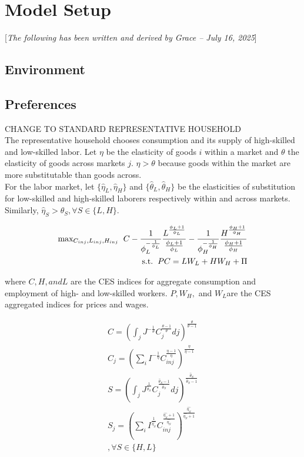


\section{Model Setup}
[\textit{The following has been written and derived by Grace -- July 16, 2025}]
\subsection{Environment}

\subsection{Preferences}

CHANGE TO STANDARD REPRESENTATIVE HOUSEHOLD\\

The representative household chooses consumption and its supply of high-skilled and low-skilled labor. Let $\eta$ be the elasticity of goods $i$ within a market and $\theta$ the elasticity of goods across markets $j$. $\eta > \theta$ because goods within the market are more substitutable than goods across. \\

For the labor market, let $\{\hat{\eta}_L, \hat{\eta}_H\}$ and $\{\hat{\theta}_L,\hat{\theta}_H\} $ be the elasticities of substitution for low-skilled and high-skilled laborers respectively within and across markets. Similarly, $\hat{\eta}_S > \hat{\theta}_S, \forall S \in \{L,H\}$.

\begin{align}
    \text{max}_{C_{inj}, L_{inj}, H_{inj}} \hspace{0.2 cm} C - \frac{1}{\phi_L^{-\frac{1}{\phi_L}}}\frac{L^{\frac{\phi_L +1}{\phi_L}}}{\frac{\phi_L +1}{\phi_L}} - \frac{1}{\phi_H^{-\frac{1}{\phi_H}}}\frac{H^{\frac{\phi_H +1}{\phi_H}}}{\frac{\phi_H +1}{\phi_H}} \\
    \text{s.t.} \hspace{0.2 cm} PC =LW_L+HW_H+\Pi
\end{align}

where $C, H, and L$ are the CES indices for aggregate consumption and employment of
high- and low-skilled workers. $P, W_H,$ and $ W_L $are the CES aggregated indices for prices and wages. 

\begin{align}
    C = (\int_j J^{-\frac{1}{\theta}} C_j^{\frac{\theta-1}{\theta}}dj)^{\frac{\theta}{\theta-1}} \\
    C_j = (\sum_i I^{-\frac{1}{\eta}} C_{inj}^{\frac{\eta-1}{\eta}})^{\frac{\eta}{\eta-1}} \\
    S = (\int_j J^{\frac{1}{\hat{\theta}_S}} C_j^{\frac{\hat{\theta}_S-1}{\hat{\theta}_S}}dj)^{\frac{\hat{\theta}_S}{\hat{\theta}_S-1}} \\
    S_j = (\sum_i I^{\frac{1}{\hat{\eta_S}}} C_{inj}^{\frac{\hat{\eta_S}+1}{\hat{\eta_S}}})^{\frac{\hat{\eta_S}}{\hat{\eta_S}+1}} \\
    , \forall S \in \{H,L\}
\end{align}


